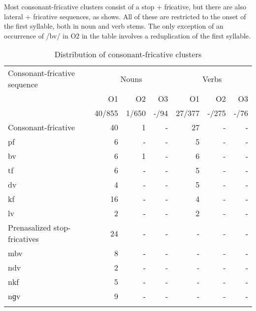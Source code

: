 Most consonant-fricative clusters consist of a stop + fricative, but there are also lateral + fricative sequences, as  shows. All of these are restricted to the onset of the first syllable, both in noun and verb stems. The only exception of an occurrence of /bv/ in O2 in the table involves a reduplication of the first syllable.



\begin{table}
\begin{tabular}{l rrr rrr}
 \lsptoprule
Consonant-fricative sequence  & \multicolumn{3}{c}{Nouns} & \multicolumn{3}{c}{Verbs}\\\cmidrule(lr){2-4}\cmidrule(lr){5-7}
              & {O1} & {O2} & {O3} &  {O1} & {O2} & {O3}   \\ 
              & 40/855   & 1/650 & -/94 & 27/377 & -/275 &  -/76 \\  \midrule
{Consonant-fricative}  & {40} & {1}  &  -  & {27} & - & - \\
			   pf       &  6  & -  &  - & 5 & - & - \\
			   bv        &  6  &  1  &  - & 6 & - & - \\
                             tf   &  6  & -  & - & 5 & - & - \\
                             dv   & 4   & -  &  - & 5 & - & - \\
                            kf      & 16  & -  & - & 4 & - & -  \\ 
                            lv      & 2  & -  & - & 2 & - & -  \\  \midrule
{Prenasalized stop-fricatives}  & {24} & - & - & - & - & -    \\
                            mbv   & 8  & -  &  -  & - & - & -  \\
			    ndv    & 2   & -  & -  & - & - & -  \\
                           nkf    &  5  & -  &  -  & - & - & -  \\
                           nɡv   &   9  & -  & - & - & - & -  \\        
 \lspbottomrule
\end{tabular}
\caption{Distribution of consonant-fricative clusters}
\label{Tab:Aff}
\end{table}

